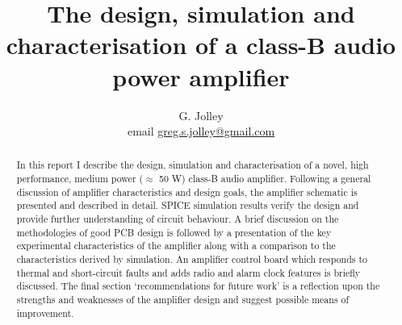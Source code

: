 \documentclass[a4paper,10pt, oneside]{article}
\title{The design, simulation and characterisation of a class-B audio power amplifier}
\author{G. Jolley\\ email \href{mailto:greg.s.jolley@gmail.com}{greg.s.jolley@gmail.com}}
\begin{document}
\maketitle

\begin{abstract}
In this report I describe the design, simulation and characterisation of a novel, high performance, 
medium power ($\approx$ 50 W) class-B audio amplifier. Following a general discussion of amplifier characteristics 
and design goals, the amplifier schematic is presented and described in detail. SPICE simulation results verify the design and provide further understanding of circuit behaviour. A brief discussion on the methodologies of good PCB design is followed by 
a presentation of the key experimental characteristics of the amplifier along with a comparison to the characteristics 
derived by simulation. An amplifier control board which responds to thermal and short-circuit faults and adds radio and alarm 
clock features is briefly discussed. The final section `recommendations for future work' is a reflection upon the 
strengths and weaknesses of the amplifier design and suggest possible means of improvement. 
\end{abstract}
\end{document}
